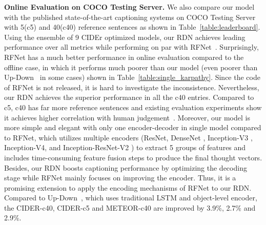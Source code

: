 \documentclass[10pt,twocolumn,letterpaper]{article}
\begin{document}
\vspace{-0.04in}
\smallskip\noindent\textbf{Online Evaluation on COCO Testing Server.} 
We also compare our model with the published state-of-the-art captioning systems on COCO Testing Server with 5(c5) and 40(c40) reference sentences as shown in Table~\ref{table:leaderboard}.
Using the ensemble of 9 CIDEr optimized models, our RDN achieves leading performance over all metrics while performing on par with RFNet~\cite{jiang2018recurrent}.
Surprisingly, RFNet has a much better performance in online evaluation compared to the offline case, in which it performs much poorer than our model (even poorer than Up-Down~\cite{anderson2017bottom} in some cases) shown in Table~\ref{table:single_karpathy}. 
Since the code of RFNet is not released, it is hard to investigate the inconsistence. 
Nevertheless, our RDN achieves the superior performance in all the c40 entries.
Compared to c5, c40 has far more reference sentences and existing evaluation experiments show it achieves higher correlation with human judgement~\cite{chen2015microsoft,vedantam2015cider}. 
Moreover, our model is more simple and elegant with only one encoder-decoder in single model compared to RFNet, which utilizes multiple encoders (ResNet, DenseNet \cite{huang2017densely}, Inception-V3 \cite{szegedy2016rethinking} , Inception-V4, and Inception-ResNet-V2 \cite{szegedy2017inception})  to extract 5 groups of features and includes time-consuming feature fusion steps to produce the final thought vectors.
Besides, our RDN boosts captioning performance by optimizing the decoding stage while RFNet mainly focuses on improving the encoder.
Thus, it is a promising extension to apply the encoding mechanisms of RFNet to our RDN.
Compared to Up-Down~\cite{anderson2017bottom}, which uses traditional LSTM and object-level encoder, the CIDER-c40, CIDER-c5 and METEOR-c40 are improved by 3.9\%, 2.7\% and 2.9\%.

\iffalse 
However, compared to our RDN's single encoder-decoder structure, RFNet has far more model parameters, which utilizes mutiple image encoders (ResNet, DenseNet~\cite{huang2017densely}, Inception-V3~\cite{szegedy2016rethinking} , Inception-V4, and Inception-ResNet-V2~\cite{szegedy2017inception}) to extract different groups of image features and includes two time-consuming feature fusion steps.
Also, considering the inconsistent single model result of RFNet in Table~\ref{table:single_karpathy}, where our RDN outperforms it by a large margin (improving CIDEr score by 3.2) and Up-Down also surpasses its CIDEr score by 1.0, it can be inferred that the final performance of RFNet is highly influenced by its recurrent fusion strategy and the technical tricks (data augmentation, etc.) used during leaderboard submission, which is less robust than our RDN. 
Moreover, RDN boosts captioning performance by optimizing the target decoding process while RFNet mainly focuses on improving the encoder to supply more meaningful representation for the decoder, which are complementary to each other.
Compared to previous state-of-the-art Up-Down~\cite{anderson2017bottom}, RDN improves the CIDER-c40, CIDER-c5 and METEOR-c40 entries by 3.9\%, 2.7\% and 2.9\%.
\fi
\end{document}
